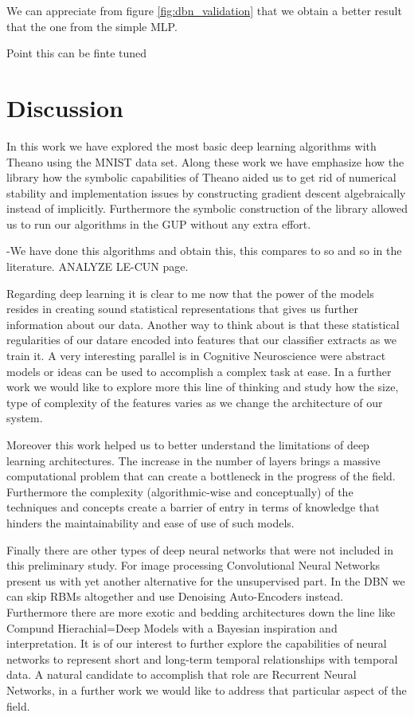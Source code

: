 \documentclass[11pt,a4paper]{article}
\begin{document}
	
We can appreciate from figure \ref{fig:dbn_validation} that we obtain a better result that the one from the simple MLP. 

Point this can be finte tuned

\section{Discussion}

In this work we have explored the most basic deep learning algorithms with Theano using the MNIST data set. Along these work we have emphasize how the library how the symbolic capabilities of Theano aided us to get rid of numerical stability and implementation issues by constructing gradient descent algebraically instead of implicitly. Furthermore the symbolic construction of the library allowed us to run our algorithms in the GUP without any extra effort. 

-We have done this algorithms and obtain this, this compares to so and so in the literature. ANALYZE LE-CUN page.

Regarding deep learning it is clear to me now that the power of the models resides in creating sound statistical representations that gives us further information about our data. Another way to think about is that these statistical regularities of our datare encoded into features that our classifier extracts as we train it. A very interesting parallel is in Cognitive Neuroscience were abstract models or ideas can be used to accomplish a complex task at ease. In a further work we would like to explore more this line of thinking and study how the size, type of complexity of the features varies as we change the architecture of our system. 

Moreover this work helped us to better understand the limitations of deep learning architectures. The increase in the number of layers brings a massive computational problem that can create a bottleneck in the progress of the field. Furthermore the complexity (algorithmic-wise and conceptually) of the techniques and concepts create a barrier of entry in terms of knowledge that hinders the maintainability and ease of use of such models. 

Finally there are other types of deep neural networks that were not included in this preliminary study.  For image processing Convolutional Neural Networks present us with yet another alternative for the unsupervised part. In the DBN we can skip RBMs altogether and use Denoising Auto-Encoders instead. Furthermore there are more exotic and bedding architectures down the line like Compund Hierachial=Deep Models with a Bayesian inspiration and interpretation. It is of our interest to further explore the capabilities of neural networks to represent short and long-term temporal relationships with temporal data. A natural candidate to accomplish that role are Recurrent Neural Networks, in a further work we would like to address that particular aspect of the field. 



\end{document}

